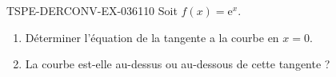 \begin{exercice}{TSPE-DERCONV-EX-036}{1}{10}
Soit $f(x) = \mathrm{e}^x$.
\begin{enumerate}
  \item Déterminer l'équation de la tangente a la courbe en $x = 0$.
  \item La courbe est-elle au-dessus ou au-dessous de cette tangente ?
\end{enumerate}

\end{exercice}
